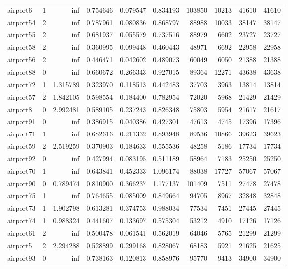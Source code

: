 \documentclass[../../../thesis.tex]{subfiles}
\begin{document}
\begin{longtable}{|l|r|r|r|r|r|r|r|r|r|}
airport6 & 1 & inf & 0.754646 & 0.079547 & 0.834193 & 103850 & 10213 & 41610 & 41610 \\
airport54 & 2 & inf & 0.787961 & 0.080836 & 0.868797 & 88988 & 10033 & 38147 & 38147 \\
airport55 & 2 & inf & 0.681937 & 0.055579 & 0.737516 & 88979 & 6602 & 23727 & 23727 \\
airport58 & 2 & inf & 0.360995 & 0.099448 & 0.460443 & 48971 & 6692 & 22958 & 22958 \\
airport56 & 2 & inf & 0.446471 & 0.042602 & 0.489073 & 60049 & 6050 & 21388 & 21388 \\
airport88 & 0 & inf & 0.660672 & 0.266343 & 0.927015 & 89364 & 12271 & 43638 & 43638 \\
airport72 & 1 & 1.315789 & 0.323970 & 0.118513 & 0.442483 & 37703 & 3963 & 13814 & 13814 \\
airport57 & 2 & 1.842105 & 0.598554 & 0.184400 & 0.782954 & 72020 & 5968 & 21429 & 21429 \\
airport8 & 0 & 2.992481 & 0.589105 & 0.237243 & 0.826348 & 75803 & 5954 & 21617 & 21617 \\
airport91 & 0 & inf & 0.386915 & 0.040386 & 0.427301 & 47613 & 4745 & 17396 & 17396 \\
airport71 & 1 & inf & 0.682616 & 0.211332 & 0.893948 & 89536 & 10866 & 39623 & 39623 \\
airport59 & 2 & 2.519259 & 0.370903 & 0.184633 & 0.555536 & 48258 & 5186 & 17734 & 17734 \\
airport92 & 0 & inf & 0.427994 & 0.083195 & 0.511189 & 58964 & 7183 & 25250 & 25250 \\
airport70 & 1 & inf & 0.643841 & 0.452333 & 1.096174 & 88038 & 17727 & 57067 & 57067 \\
airport90 & 0 & 0.789474 & 0.810900 & 0.366237 & 1.177137 & 101409 & 7511 & 27478 & 27478 \\
airport75 & 1 & inf & 0.764655 & 0.085009 & 0.849664 & 94705 & 8967 & 32848 & 32848 \\
airport73 & 1 & 1.902798 & 0.613281 & 0.374753 & 0.988034 & 77534 & 7451 & 27445 & 27445 \\
airport74 & 1 & 0.988324 & 0.441607 & 0.133697 & 0.575304 & 53212 & 4910 & 17126 & 17126 \\
airport61 & 2 & inf & 0.500478 & 0.061541 & 0.562019 & 64046 & 5765 & 21299 & 21299 \\
airport5 & 2 & 2.294288 & 0.528899 & 0.299168 & 0.828067 & 68183 & 5921 & 21625 & 21625 \\
airport93 & 0 & inf & 0.738163 & 0.120813 & 0.858976 & 95770 & 9413 & 34900 & 34900 \\

\end{longtable}
\end{document}
